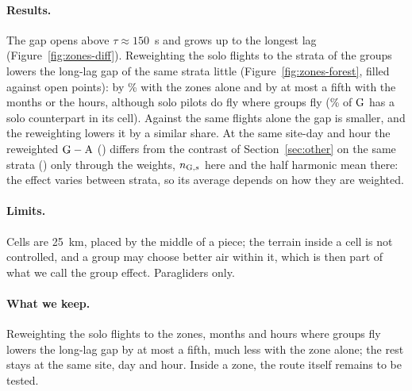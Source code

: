 \paragraph{Results.} The gap opens above $\tau\approx150$~s and grows up to the longest lag
(Figure~\ref{fig:zones-diff}). Reweighting the solo flights to the strata of the groups lowers the
long-lag gap of the same strata little (Figure~\ref{fig:zones-forest}, filled against open points):
by \ZoneRedLocZone\% with the zones alone and by at most a fifth with the months or the hours,
although solo pilots do fly where groups fly (\ZoneKeptZone\% of $\mathrm{G}$ has a solo counterpart in its
cell). Against the same flights alone the gap is smaller, and the reweighting lowers it by a similar
share. At the same site-day and hour the reweighted $\mathrm{G}-\mathrm{A}$ (\ZoneDHlocASdh) differs from the
contrast of Section~\ref{sec:other} on the same strata (\DHlocThousandGroupSdh) only through the
weights, $n_{\mathrm{G},s}$ here and the half harmonic mean there: the effect varies between strata, so its
average depends on how they are weighted.

\paragraph{Limits.} Cells are 25~km, placed by the middle of a piece; the terrain inside a cell is
not controlled, and a group may choose better air within it, which is then part of what we call the
group effect. Paragliders only.

\paragraph{What we keep.} Reweighting the solo flights to the zones, months and hours where groups fly
lowers the long-lag gap by at most a fifth, much less with the zone alone; the rest stays at the same
site, day and hour. Inside a zone, the route itself remains to be tested.
